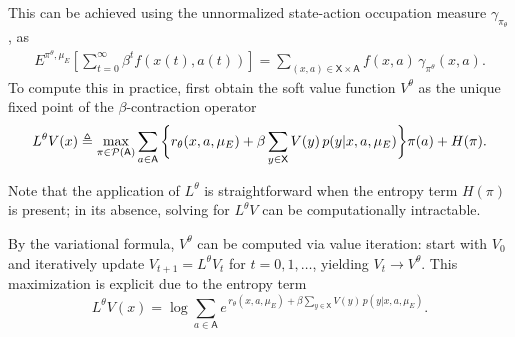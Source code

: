 \documentclass[11pt]{article}
\newcommand{\sX}{{\mathsf X}}
\newcommand{\sA}{{\mathsf A}}
\newcommand{\Pnew}{{\mathcal P}}
\begin{document}

This can be achieved using the unnormalized state-action occupation measure $\gamma_{\pi_\theta}$, as
\begin{align*}
E^{\pi^{\theta},\mu_E} \left[ \sum_{t=0}^{\infty} \beta^t f(x(t),a(t)) \right] 
= \sum_{(x,a) \in \sX\times\sA} f(x,a) \, \gamma_{\pi^{\theta}}(x,a).
\end{align*}
To compute this in practice, first obtain the soft value function $V^\theta$ as the unique fixed point of the $\beta$-contraction operator
\small
$$L^{\theta} V(x) \triangleq 
\max_{\pi \in \Pnew(\sA)} 
\sum_{a \in \sA} \bigg\{
r_{\theta}(x,a,\mu_E)  \\ 
+ \beta \sum_{y \in \sX} V(y) \, p(y|x,a,\mu_E) \bigg\} \pi(a) + H(\pi) .$$

\normalsize
Note that the application of $L^\theta$ is straightforward when the entropy term $H(\pi)$ is present; in its absence, solving for $L^\theta V$ can be computationally intractable.

By the variational formula, $V^\theta$ can be computed via value iteration: start with $V_0$ and iteratively update $V_{t+1} = L^\theta V_t$ for $t = 0, 1, \dots$, yielding $V_t \to V^\theta$. This maximization is explicit due to the entropy term
$$L^{\theta} V(x) =
\log \sum_{a \in \sA} 
e^{\,r_{\theta}(x,a,\mu_E) + \beta \sum_{y \in \sX} V(y) \, p(y|x,a,\mu_E)}.$$
\end{document}
